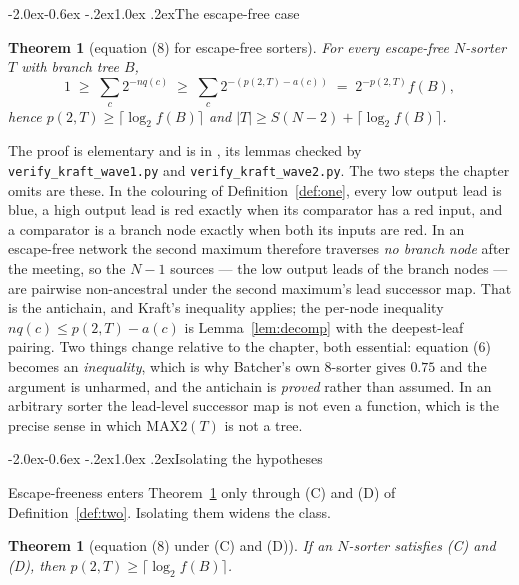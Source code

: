 \documentclass[11pt,a4paper]{article}
\makeatletter
\renewcommand\subsection{\@startsection{subsection}{2}{\z@}%
  {-2.0ex\@plus -0.6ex \@minus -.2ex}{1.0ex \@plus .2ex}{\normalfont\normalsize\bfseries}}
\newtheorem{theorem}[statement]{Theorem}
\newcommand{\MAXTWO}{\mathrm{MAX2}}
\makeatother
\begin{document}
\subsection{The escape-free case}

\begin{theorem}[equation (8) for escape-free sorters]
\label{thm:ef}
For every escape-free $N$-sorter $T$ with branch tree $B$,
\[
  1 \;\ge\; \sum_c 2^{-nq(c)} \;\ge\; \sum_c 2^{-(p(2,T)-a(c))}
    \;=\; 2^{-p(2,T)} f(B) ,
\]
hence $p(2,T) \ge \lceil \log_2 f(B)\rceil$ and
$|T| \ge S(N-2) + \lceil \log_2 f(B)\rceil$.
\end{theorem}

The proof is elementary and is in \cite{Art}, its lemmas checked by
\texttt{verify\_kraft\_wave1.py} and \texttt{verify\_kraft\_wave2.py}. The two
steps the chapter omits are these. In the colouring of Definition~\ref{def:one},
every low output lead is blue, a high output lead is red exactly when its
comparator has a red input, and a comparator is a branch node exactly when both
its inputs are red. In an escape-free network the second maximum therefore
traverses \emph{no branch node} after the meeting, so the $N-1$ sources --- the
low output leads of the branch nodes --- are pairwise non-ancestral under the
second maximum's lead successor map. That is the antichain, and Kraft's
inequality applies; the per-node inequality $nq(c) \le p(2,T) - a(c)$ is
Lemma~\ref{lem:decomp} with the deepest-leaf pairing. Two things change relative
to the chapter, both essential: equation (6) becomes an \emph{inequality}, which
is why Batcher's own 8-sorter gives $0.75$ and the argument is unharmed, and the
antichain is \emph{proved} rather than assumed. In an arbitrary sorter the
lead-level successor map is not even a function, which is the precise sense in
which $\MAXTWO(T)$ is not a tree.

\subsection{Isolating the hypotheses}

Escape-freeness enters Theorem~\ref{thm:ef} only through (C) and (D) of
Definition~\ref{def:two}. Isolating them widens the class.

\begin{theorem}[equation (8) under (C) and (D)]
\label{thm:cd}
If an $N$-sorter satisfies (C) and (D), then
$p(2,T) \ge \lceil \log_2 f(B)\rceil$.
\end{theorem}
\end{document}
